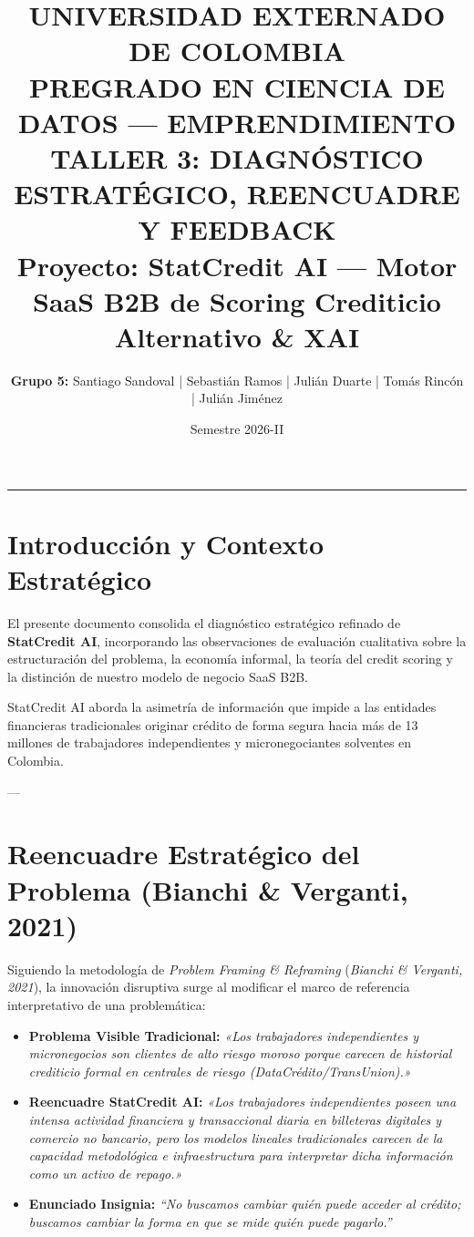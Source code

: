 \documentclass[11pt,a4paper]{article}
\title{
    \vspace{-1cm}
    \textbf{\Large UNIVERSIDAD EXTERNADO DE COLOMBIA}\\
    \textbf{\large PREGRADO EN CIENCIA DE DATOS --- EMPRENDIMIENTO}\\
    \vspace{0.5cm}
    \Large \textbf{TALLER 3: DIAGNÓSTICO ESTRATÉGICO, REENCUADRE Y FEEDBACK}\\
    \large \textbf{Proyecto: StatCredit AI --- Motor SaaS B2B de Scoring Crediticio Alternativo \& XAI}
}
\author{\textbf{Grupo 5:} Santiago Sandoval | Sebastián Ramos | Julián Duarte | Tomás Rincón | Julián Jiménez}
\date{Semestre 2026-II}
\begin{document}
\maketitle

\hrule
\vspace{0.5cm}

\section{Introducción y Contexto Estratégico}
El presente documento consolida el diagnóstico estratégico refinado de \textbf{StatCredit AI}, incorporando las observaciones de evaluación cualitativa sobre la estructuración del problema, la economía informal, la teoría del credit scoring y la distinción de nuestro modelo de negocio SaaS B2B.

StatCredit AI aborda la asimetría de información que impide a las entidades financieras tradicionales originar crédito de forma segura hacia más de 13 millones de trabajadores independientes y micronegociantes solventes en Colombia.

---

\section{Reencuadre Estratégico del Problema (Bianchi \& Verganti, 2021)}
Siguiendo la metodología de \textit{Problem Framing \& Reframing} (\textit{Bianchi \& Verganti, 2021}), la innovación disruptiva surge al modificar el marco de referencia interpretativo de una problemática:

\begin{tcolorbox}[title=El Reencuadre de StatCredit AI]
\begin{itemize}[leftmargin=*]
    \item \textbf{Problema Visible Tradicional:} \textit{«Los trabajadores independientes y micronegocios son clientes de alto riesgo moroso porque carecen de historial crediticio formal en centrales de riesgo (DataCrédito/TransUnion).»}
    \item \textbf{Reencuadre StatCredit AI:} \textit{«Los trabajadores independientes poseen una intensa actividad financiera y transaccional diaria en billeteras digitales y comercio no bancario, pero los modelos lineales tradicionales carecen de la capacidad metodológica e infraestructura para interpretar dicha información como un activo de repago.»}
    \item \textbf{Enunciado Insignia:} \textit{“No buscamos cambiar quién puede acceder al crédito; buscamos cambiar la forma en que se mide quién puede pagarlo.”}
\end{itemize}
\end{tcolorbox}
\end{document}
